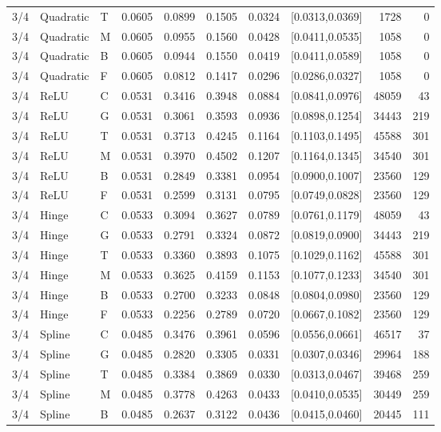 \begin{longtable}{lllrrrrlrr}
3/4 & Quadratic & T & 0.0605 & 0.0899 & 0.1505 & 0.0324 & [0.0313,0.0369] & 1728 & 0 \\
3/4 & Quadratic & M & 0.0605 & 0.0955 & 0.1560 & 0.0428 & [0.0411,0.0535] & 1058 & 0 \\
3/4 & Quadratic & B & 0.0605 & 0.0944 & 0.1550 & 0.0419 & [0.0411,0.0589] & 1058 & 0 \\
3/4 & Quadratic & F & 0.0605 & 0.0812 & 0.1417 & 0.0296 & [0.0286,0.0327] & 1058 & 0 \\
3/4 & ReLU & C & 0.0531 & 0.3416 & 0.3948 & 0.0884 & [0.0841,0.0976] & 48059 & 43 \\
3/4 & ReLU & G & 0.0531 & 0.3061 & 0.3593 & 0.0936 & [0.0898,0.1254] & 34443 & 219 \\
3/4 & ReLU & T & 0.0531 & 0.3713 & 0.4245 & 0.1164 & [0.1103,0.1495] & 45588 & 301 \\
3/4 & ReLU & M & 0.0531 & 0.3970 & 0.4502 & 0.1207 & [0.1164,0.1345] & 34540 & 301 \\
3/4 & ReLU & B & 0.0531 & 0.2849 & 0.3381 & 0.0954 & [0.0900,0.1007] & 23560 & 129 \\
3/4 & ReLU & F & 0.0531 & 0.2599 & 0.3131 & 0.0795 & [0.0749,0.0828] & 23560 & 129 \\
3/4 & Hinge & C & 0.0533 & 0.3094 & 0.3627 & 0.0789 & [0.0761,0.1179] & 48059 & 43 \\
3/4 & Hinge & G & 0.0533 & 0.2791 & 0.3324 & 0.0872 & [0.0819,0.0900] & 34443 & 219 \\
3/4 & Hinge & T & 0.0533 & 0.3360 & 0.3893 & 0.1075 & [0.1029,0.1162] & 45588 & 301 \\
3/4 & Hinge & M & 0.0533 & 0.3625 & 0.4159 & 0.1153 & [0.1077,0.1233] & 34540 & 301 \\
3/4 & Hinge & B & 0.0533 & 0.2700 & 0.3233 & 0.0848 & [0.0804,0.0980] & 23560 & 129 \\
3/4 & Hinge & F & 0.0533 & 0.2256 & 0.2789 & 0.0720 & [0.0667,0.1082] & 23560 & 129 \\
3/4 & Spline & C & 0.0485 & 0.3476 & 0.3961 & 0.0596 & [0.0556,0.0661] & 46517 & 37 \\
3/4 & Spline & G & 0.0485 & 0.2820 & 0.3305 & 0.0331 & [0.0307,0.0346] & 29964 & 188 \\
3/4 & Spline & T & 0.0485 & 0.3384 & 0.3869 & 0.0330 & [0.0313,0.0467] & 39468 & 259 \\
3/4 & Spline & M & 0.0485 & 0.3778 & 0.4263 & 0.0433 & [0.0410,0.0535] & 30449 & 259 \\
3/4 & Spline & B & 0.0485 & 0.2637 & 0.3122 & 0.0436 & [0.0415,0.0460] & 20445 & 111 \\

\end{longtable}

